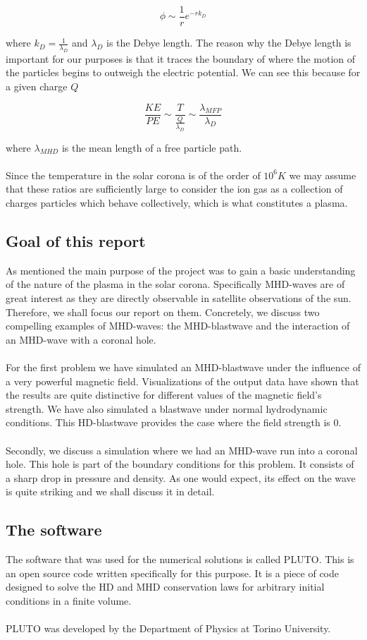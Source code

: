 $$ \phi  \sim \frac{1}{r} e^{-r k_D}$$

where $k_D = \frac{1}{\lambda_D}$ and $ \lambda_D $ is the Debye length. The reason why the Debye length is important for our purposes is that it traces the boundary of where the motion of the particles begins to outweigh the electric potential. We can see this because for a given charge $Q$ 

$$ \frac{KE}{PE}  \sim \frac{T}{\frac{Q}{\lambda_D}}  \sim \frac{\lambda_{MFP}}{\lambda_D} $$

where $\lambda_{MHD}$ is the mean length of a free particle path.\\
\\
Since the temperature in the solar corona is of the order of $10^6 K$ we may assume that these ratios are sufficiently large to consider the ion gas as a collection of charges particles which behave collectively, which is what constitutes a plasma.

\subsection*{Goal of this report}

As mentioned the main purpose of the project was to gain a basic understanding of the nature of the plasma in the solar corona. Specifically MHD-waves are of great interest as they are directly observable in satellite observations of the sun. Therefore, we shall focus our report on them. Concretely, we discuss two compelling examples of MHD-waves: the MHD-blastwave and the interaction of an MHD-wave with a coronal hole.\\
\\
For the first problem we have simulated an MHD-blastwave under the influence of a very powerful magnetic field. Visualizations of the output data have shown that the results are quite distinctive for different values of the magnetic field's strength. We have also simulated a blastwave under normal hydrodynamic conditions. This HD-blastwave provides the case where the field strength is $0$.\\
\\
Secondly, we discuss a simulation where we had an MHD-wave run into a coronal hole. This hole is part of the boundary conditions for this problem. It consists of a sharp drop in pressure and density. As one would expect, its effect on the wave is quite striking and we shall discuss it in detail.

\subsection*{The software}

The software that was used for the numerical solutions is called PLUTO. This is an open source code written specifically for this purpose. It is a piece of code designed to solve the HD and MHD conservation laws for arbitrary initial conditions in a finite volume.\\
\\
PLUTO was developed by the Department of Physics at Torino University. 



